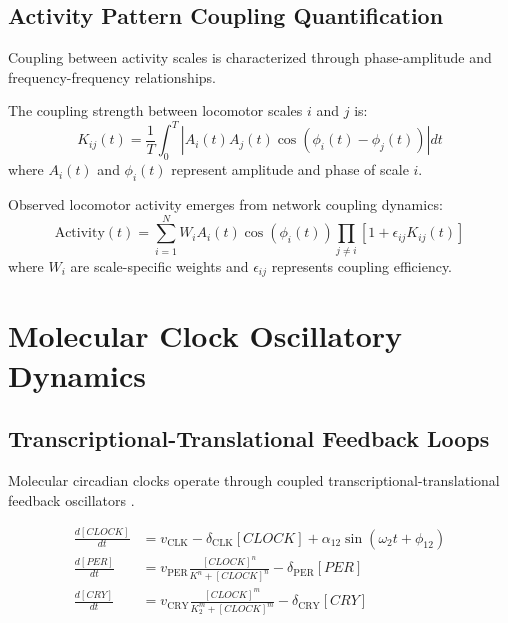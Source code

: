 \documentclass[twocolumn]{article}
\begin{document}
\subsection{Activity Pattern Coupling Quantification}

Coupling between activity scales is characterized through phase-amplitude and frequency-frequency relationships.

\begin{definition}
The coupling strength between locomotor scales $i$ and $j$ is:
\begin{equation}
K_{ij}(t) = \frac{1}{T} \int_0^T \left| A_i(t) A_j(t) \cos(\phi_i(t) - \phi_j(t)) \right| dt
\label{eq:activity_coupling}
\end{equation}
where $A_i(t)$ and $\phi_i(t)$ represent amplitude and phase of scale $i$.
\end{definition}

\begin{definition}
Observed locomotor activity emerges from network coupling dynamics:
\begin{equation}
\text{Activity}(t) = \sum_{i=1}^{N} W_i A_i(t) \cos(\phi_i(t)) \prod_{j \neq i} [1 + \epsilon_{ij} K_{ij}(t)]
\label{eq:activity_output}
\end{equation}
where $W_i$ are scale-specific weights and $\epsilon_{ij}$ represents coupling efficiency.
\end{definition}

\section{Molecular Clock Oscillatory Dynamics}

\subsection{Transcriptional-Translational Feedback Loops}

Molecular circadian clocks operate through coupled transcriptional-translational feedback oscillators \citep{takahashi2017transcriptional}.

\begin{align}
\frac{d[CLOCK]}{dt} &= v_{\text{CLK}} - \delta_{\text{CLK}} [CLOCK] + \alpha_{12} \sin(\omega_2 t + \phi_{12}) \label{eq:clock} \\
\frac{d[PER]}{dt} &= v_{\text{PER}} \frac{[CLOCK]^n}{K^n + [CLOCK]^n} - \delta_{\text{PER}} [PER] \label{eq:per} \\
\frac{d[CRY]}{dt} &= v_{\text{CRY}} \frac{[CLOCK]^m}{K_2^m + [CLOCK]^m} - \delta_{\text{CRY}} [CRY] \label{eq:cry}
\end{align}
\end{document}
